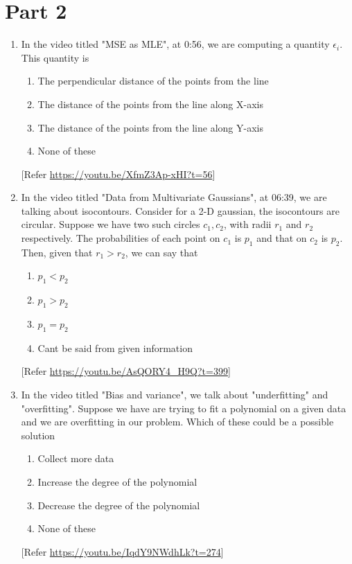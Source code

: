 \documentclass{article}
\begin{document}
\section{Part 2}
\begin{enumerate}
    \item In the video titled "MSE as MLE", at 0:56, we are computing a quantity $\epsilon_i$. This quantity is
        \begin{enumerate}
            \item The perpendicular distance of the points from the line
            \item The distance of the points from the line along X-axis
            \item The distance of the points from the line along Y-axis
            \item None of these
        \end{enumerate}
    [Refer \url{https://youtu.be/XfmZ3Ap-xHI?t=56}]


    \item In the video titled "Data from Multivariate Gaussians", at 06:39, we are talking about isocontours. Consider for a 2-D gaussian, the isocontours are circular. Suppose we have two such circles $c_1, c_2$, with radii $r_1$ and $r_2$ respectively. The probabilities of each point on $c_1$ is $p_1$ and that on $c_2$ is $p_2$. Then, given that $r_1>r_2$, we can say that
    \begin{enumerate}
        \item $p_1<p_2$
        \item $p_1>p_2$
        \item $p_1=p_2$
        \item Cant be said from given information
    \end{enumerate}
    [Refer \url{https://youtu.be/AsQORY4_H9Q?t=399}]


    \item In the video titled "Bias and variance", we talk about "underfitting" and "overfitting". Suppose we have are trying to fit a polynomial on a given data and we are overfitting in our problem. Which of these could be a possible solution
    \begin{enumerate}
        \item Collect more data
        \item Increase the degree of the polynomial
        \item Decrease the degree of the polynomial
        \item None of these
    \end{enumerate}
    [Refer \url{https://youtu.be/IqdY9NWdhLk?t=274}]


\end{enumerate}
\end{document}
